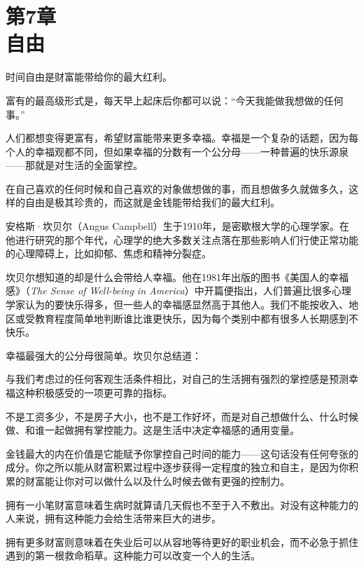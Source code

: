 
\section[第7章\q 自由]{第7章\\ 自由}

{\kaishu

时间自由是财富能带给你的最大红利。

}

富有的最高级形式是，每天早上起床后你都可以说：“今天我能做我想做的任何事。”

人们都想变得更富有，希望财富能带来更多幸福。幸福是一个复杂的话题，因为每个人的幸福观都不同，但如果幸福的分数有一个公分母——一种普遍的快乐源泉——那就是对生活的全面掌控。

在自己喜欢的任何时候和自己喜欢的对象做想做的事，而且想做多久就做多久，这样的自由是极其珍贵的，而这就是金钱能带给我们的最大红利。

安格斯·坎贝尔（Angus Campbell）生于1910年，是密歇根大学的心理学家。在他进行研究的那个年代，心理学的绝大多数关注点落在那些影响人们行使正常功能的心理障碍上，比如抑郁、焦虑和精神分裂症。

坎贝尔想知道的却是什么会带给人幸福。他在1981年出版的图书《美国人的幸福感》（\textit{The Sense of Well-being in America}）中开篇便指出，人们普遍比很多心理学家认为的要快乐得多，但一些人的幸福感显然高于其他人。我们不能按收入、地区或受教育程度简单地判断谁比谁更快乐，因为每个类别中都有很多人长期感到不快乐。

幸福最强大的公分母很简单。坎贝尔总结道：

{\kaishu

与我们考虑过的任何客观生活条件相比，对自己的生活拥有强烈的掌控感是预测幸福这种积极感受的一项更可靠的指标。

}

不是工资多少，不是房子大小，也不是工作好坏，而是对自己想做什么、什么时候做、和谁一起做拥有掌控能力。这是生活中决定幸福感的通用变量。

金钱最大的内在价值是它能赋予你掌控自己时间的能力——这句话没有任何夸张的成分。你之所以能从财富积累过程中逐步获得一定程度的独立和自主，是因为你积累的财富能让你对可以做什么以及什么时候去做有更强的控制力。

拥有一小笔财富意味着生病时就算请几天假也不至于入不敷出。对没有这种能力的人来说，拥有这种能力会给生活带来巨大的进步。

拥有更多财富则意味着在失业后可以从容地等待更好的职业机会，而不必急于抓住遇到的第一根救命稻草。这种能力可以改变一个人的生活。

